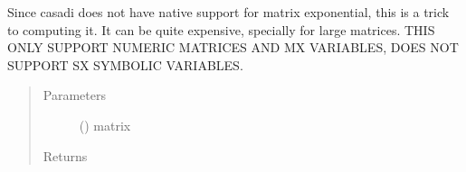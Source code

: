 \documentclass[letterpaper,10pt,english]{sphinxmanual}
\begin{document}
\begin{fulllineitems}
\label{\detokenize{yaocptool.util:yaocptool.util.util.expm}}
Since casadi does not have native support for matrix exponential, this is a trick to computing it.
It can be quite expensive, specially for large matrices.
THIS ONLY SUPPORT NUMERIC MATRICES AND MX VARIABLES, DOES NOT SUPPORT SX SYMBOLIC VARIABLES.
\begin{quote}\begin{description}
\item[{Parameters}] \leavevmode
{} () \textendash{} matrix

\item[{Returns}] \leavevmode


\end{description}\end{quote}

\end{fulllineitems}


\begin{fulllineitems}
\label{\detokenize{yaocptool.util:yaocptool.util.util.find_variables_indices_in_vector}}
\end{fulllineitems}


\begin{fulllineitems}
\label{\detokenize{yaocptool.util:yaocptool.util.util.join_thetas}}
\end{fulllineitems}

\end{document}
